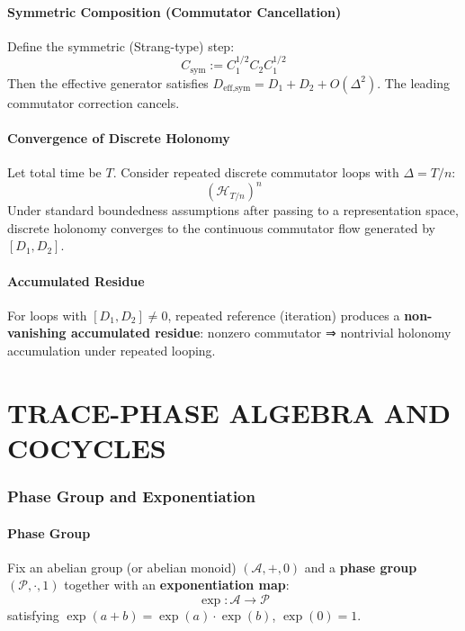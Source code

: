 \documentclass[12pt, oneside]{article}
\newcommand{\A}{\mathcal{A}}
\begin{document}
\subsection{Symmetric Composition (Commutator Cancellation)}

Define the symmetric (Strang-type) step:
\begin{equation}
C_{\text{sym}} := C_1^{1/2} C_2 C_1^{1/2}
\end{equation}
Then the effective generator satisfies $D_{\text{eff,sym}} = D_1 + D_2 + O(\Delta^2)$. The leading commutator correction cancels.

\subsection{Convergence of Discrete Holonomy}

Let total time be $T$. Consider repeated discrete commutator loops with $\Delta = T/n$:
\begin{equation}
(\mathcal{H}_{T/n})^n
\end{equation}
Under standard boundedness assumptions after passing to a representation space, discrete holonomy converges to the continuous commutator flow generated by $[D_1, D_2]$.

\subsection{Accumulated Residue}

For loops with $[D_1, D_2] \neq 0$, repeated reference (iteration) produces a \textbf{non-vanishing accumulated residue}: nonzero commutator ⇒ nontrivial holonomy accumulation under repeated looping.

\newpage

\part{TRACE-PHASE ALGEBRA AND COCYCLES}

\section{Phase Group and Exponentiation}

\subsection{Phase Group}

Fix an abelian group (or abelian monoid) $(\A, +, 0)$ and a \textbf{phase group} $(\mathcal{P}, \cdot, 1)$ together with an \textbf{exponentiation map}:
\begin{equation}
\exp: \A \rightarrow \mathcal{P}
\end{equation}
satisfying $\exp(a + b) = \exp(a) \cdot \exp(b)$, $\exp(0) = 1$.
\end{document}
